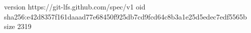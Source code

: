 version https://git-lfs.github.com/spec/v1
oid sha256:e42d8357f161daaad77e68450f925db7cd9fcd64c8b3a1e25d5edec7edf5565b
size 2319
